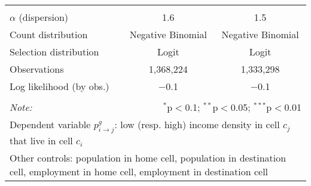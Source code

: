 \begin{table}[!htbp]
{\begin{tabular}{@{\extracolsep{5pt}}lcccc}
 &  &  &  & \\
\hline \hline \\[-1.8ex]
$\alpha$ (dispersion) & \multicolumn{2}{c}{1.6} & \multicolumn{2}{c}{1.5} \\
Count distribution & \multicolumn{2}{c}{Negative Binomial} & \multicolumn{2}{c}{Negative Binomial} \\
Selection distribution & \multicolumn{2}{c}{Logit} & \multicolumn{2}{c}{Logit} \\
Observations & \multicolumn{2}{c}{1,368,224} & \multicolumn{2}{c}{1,333,298} \\
Log likelihood (by obs.) & \multicolumn{2}{c}{$-$0.1} & \multicolumn{2}{c}{$-$0.1} \\
\hline
\hline \\[-1.8ex]
\textit{Note:}  & \multicolumn{4}{r}{$^{*}$p$<$0.1; $^{**}$p$<$0.05; $^{***}$p$<$0.01} \\
 \multicolumn{5}{p{0.9\linewidth}}{\parbox[t]{\textwidth}{Dependent variable $p_{i \to j}^g$: low (resp. high) income density in cell $c_j$ that live in cell $c_i$}} \\
\multicolumn{5}{p{0.9\linewidth}}{\parbox[t]{\textwidth}{Other controls: population in home cell, population in destination cell, employment in home cell, employment in destination cell}}
\end{tabular}

}
\end{table}
